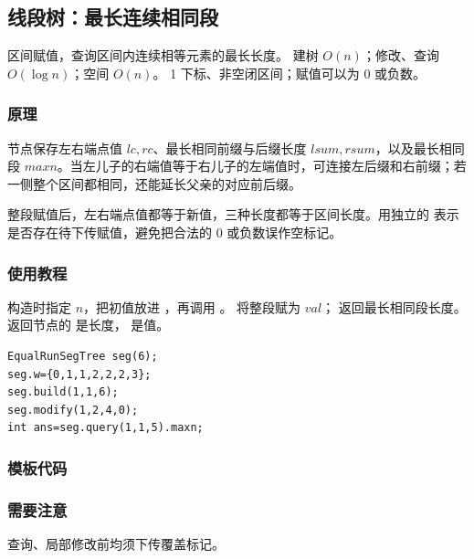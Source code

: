 \subsection{线段树：最长连续相同段}
\label{ds:seg-equal-run}
\AlgorithmInfo
    {区间赋值，查询区间内连续相等元素的最长长度。}
    {建树 $O(n)$；修改、查询 $O(\log n)$；空间 $O(n)$。}
    {1 下标、非空闭区间；赋值可以为 0 或负数。}
\subsubsection*{原理}
节点保存左右端点值 $lc,rc$、最长相同前缀与后缀长度 $lsum,rsum$，以及最长相同段 $maxn$。当左儿子的右端值等于右儿子的左端值时，可连接左后缀和右前缀；若一侧整个区间都相同，还能延长父亲的对应前后缀。

整段赋值后，左右端点值都等于新值，三种长度都等于区间长度。用独立的  表示是否存在待下传赋值，避免把合法的 0 或负数误作空标记。

\subsubsection*{使用教程}
构造时指定 $n$，把初值放进 ，再调用 。 将整段赋为 $val$； 返回最长相同段长度。返回节点的  是长度， 是值。
\begin{lstlisting}[style=mtycpp,numbers=none]
EqualRunSegTree seg(6);
seg.w={0,1,1,2,2,2,3};
seg.build(1,1,6);
seg.modify(1,2,4,0);
int ans=seg.query(1,1,5).maxn;
\end{lstlisting}
\subsubsection*{模板代码}
\subsubsection*{需要注意}
查询、局部修改前均须下传覆盖标记。
